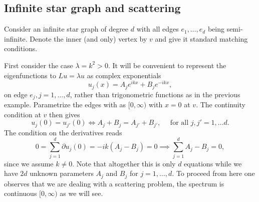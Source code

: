 \subsection{Infinite star graph and scattering}\label{sec: infinite star graph}\label{sec: scattering from infinite star graph}

Consider an infinite star graph of degree $d$ with all edges $e_1, \ldots, e_d$ being semi-infinite. Denote the inner (and only) vertex by $v$ and give it standard matching conditions.

First consider the case $\lambda = k^2 > 0$. It will be convenient to represent the eigenfunctions to $Lu = \lambda u$ as complex exponentials
\[
  u_j(x) = A_je^{ikx} + B_je^{-ikx},
\]
on edge $e_j, j=1,\ldots,d$, rather than trigonometric functions as in the previous example. Parametrize the edges with as $[0,\infty)$ with $x=0$ at $v$. The continuity condition at $v$ then gives
\[
  u_j(0) = u_{j'}(0) \iff  A_j + B_j = A_{j'} + B_{j'}, \quad\text{ for all } j, j' = 1, \ldots d.
\]
The condition on the derivatives reads
\[
  0 = \sum_{j=1}^{d} \partial u_j(0) = -ik(A_j-B_j) = 0 \implies \sum_{j=1}^{d} A_j-B_j = 0,
\]
since we assume $k\ne 0$. Note that altogether this is only $d$ equations while we have $2d$ unknown parameters $A_j$ and $B_j$ for $j=1,\ldots,d$. To proceed from here one observes that we are dealing with a scattering problem, the spectrum is continuous $[0,\infty)$ as we will see.







